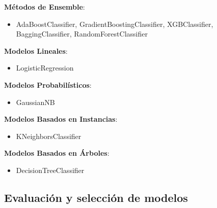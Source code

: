 \documentclass{article}
\begin{document}
\textbf{Métodos de Ensemble}:
\begin{itemize}
    \item AdaBoostClassifier, GradientBoostingClassifier, XGBClassifier, BaggingClassifier, RandomForestClassifier
\end{itemize}

\textbf{Modelos Lineales}:
\begin{itemize}
    \item LogisticRegression
\end{itemize}

\textbf{Modelos Probabilísticos}:
\begin{itemize}
    \item GaussianNB
\end{itemize}

\textbf{Modelos Basados en Instancias}:
\begin{itemize}
    \item KNeighborsClassifier
\end{itemize}

\textbf{Modelos Basados en Árboles}:
\begin{itemize}
    \item DecisionTreeClassifier
\end{itemize}

\subsection*{Evaluación y selección de modelos}
\end{document}
